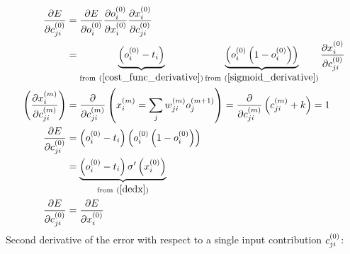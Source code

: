 \begin{align}
\pdv{E}{\Con j i 0} &= 
\pdv{E}{\Out i 0}
\pdv{\Out i 0}{\Input i 0}
\pdv{\Input i 0}{\Con j i 0}
\\
&= \underbrace{\left(\Out i 0 - \Target i \right)}_{\text{from} \ (\ref{cost_func_derivative})} \underbrace{\left(\Out i 0 \left(1 - \Out i 0\right) \right)}_{\text{from} \ (\ref{sigmoid_derivative})} \pdv{\Input i 0}{\Con j i 0} 
\\
\left( \pdv{\Input i m}{\Con j i m}\right) &= \pdv{}{\Con j i m}\left(\Input i m = \sum_j\Weight j i m\Out j {m+1} \right) = \pdv{}{\Con j i m} \left(\Con j i m + k \right) = 1\label{dxdc} 
\\
\pdv{E}{\Con j i 0}&= \left(\Out i 0 - \Target i \right) \left(\Out i 0 \left(1 - \Out i 0\right) \right)
\\
&= \underbrace{\left(\Out i 0 - \Target i \right) \sigma^{\prime}\left(\Input i 0\right)\label{dedc}}
_{\text{from} \ (\ref{dedx})} 
\\
\pdv{E}{\Con j i 0} &= \pdv{E}{\Input i 0}
\end{align}
Second derivative of the error with respect to a single input contribution $c_{ji}^{(0)}$:
